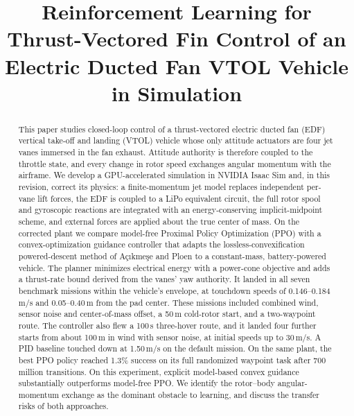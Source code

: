 \documentclass[conference]{IEEEtran}
\begin{document}
\pagestyle{plain}

\title{Reinforcement Learning for Thrust-Vectored Fin Control of an Electric Ducted Fan VTOL Vehicle in Simulation}

\author{
}

\maketitle

\begin{abstract}
This paper studies closed-loop control of a thrust-vectored electric ducted fan (EDF) vertical take-off and landing (VTOL) vehicle whose only attitude actuators are four jet vanes immersed in the fan exhaust. Attitude authority is therefore coupled to the throttle state, and every change in rotor speed exchanges angular momentum with the airframe. We develop a GPU-accelerated simulation in NVIDIA Isaac Sim and, in this revision, correct its physics: a finite-momentum jet model replaces independent per-vane lift forces, the EDF is coupled to a LiPo equivalent circuit, the full rotor spool and gyroscopic reactions are integrated with an energy-conserving implicit-midpoint scheme, and external forces are applied about the true center of mass. On the corrected plant we compare model-free Proximal Policy Optimization (PPO) with a convex-optimization guidance controller that adapts the lossless-convexification powered-descent method of A\c{c}{\i}kme\c{s}e and Ploen to a constant-mass, battery-powered vehicle. The planner minimizes electrical energy with a power-cone objective and adds a thrust-rate bound derived from the vanes' yaw authority. It landed in all seven benchmark missions within the vehicle's envelope, at touchdown speeds of 0.146--0.184\,m/s and 0.05--0.40\,m from the pad center. These missions included combined wind, sensor noise and center-of-mass offset, a 50\,m cold-rotor start, and a two-waypoint route. The controller also flew a 100\,s three-hover route, and it landed four further starts from about 100\,m in wind with sensor noise, at initial speeds up to 30\,m/s. A PID baseline touched down at 1.50\,m/s on the default mission. On the same plant, the best PPO policy reached 1.3\% success on its full randomized waypoint task after 700 million transitions. On this experiment, explicit model-based convex guidance substantially outperforms model-free PPO. We identify the rotor--body angular-momentum exchange as the dominant obstacle to learning, and discuss the transfer risks of both approaches.
\end{abstract}
\end{document}
